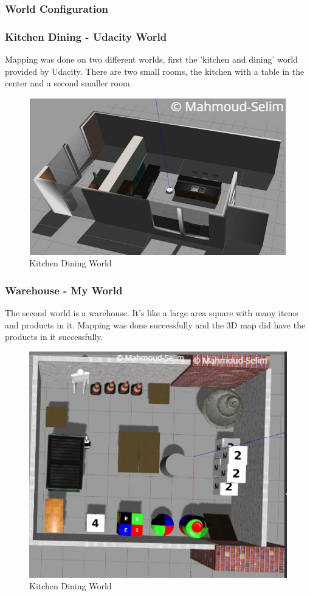 \documentclass[10pt,journal,compsoc]{IEEEtran}
\begin{document}
\subsubsection{World Configuration}
\subsubsection {Kitchen Dining - Udacity World}
Mapping was done on two different worlds, first the
’kitchen and dining’ world provided by Udacity. There are
two small rooms, the kitchen with a table in the center and
a second smaller room.
\begin{figure}[thpb]
      \centering
      \includegraphics[width=\linewidth]{kitchen_dining}
      \caption{Kitchen Dining World}
\end{figure}

\subsubsection {Warehouse - My World}
The second world is a warehouse. It's like a large area square with many items and products in it. Mapping was done successfully and the 3D map did have the products in it successfully.
\begin{figure}[thpb]
      \centering
      \includegraphics[width=\linewidth]{my_world}
      \caption{Kitchen Dining World}
\end{figure}
\end{document}
